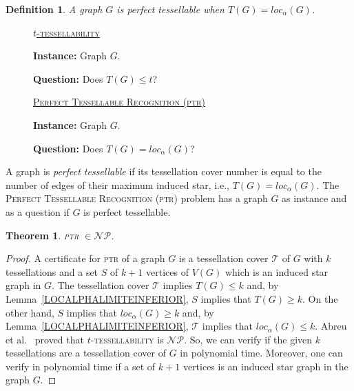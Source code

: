 \documentclass[9pt]{entcs} \usepackage{entcsmacro}
\newtheorem{defi}{Definition}[section]
\newtheorem{teo}{Theorem}[section]
\begin{document}
\begin{defi}
\emph{A graph $G$ is \textit{perfect tessellable} when $T(G) = loc_{\alpha}(G)$.}
\end{defi}

\bigskip

\begin{minipage}[c]{0.5\textwidth}
\begin{center}
		\begin{description}
			\item[] \underline{\textsc{$t$-tessellability}}
			\item[] \textbf{Instance:} Graph $G$.
			\item[] \textbf{Question:} Does $T(G) \leq t$? 
		\end{description}
\end{center}
\end{minipage}		
\hfill
\begin{minipage}[c]{0.5\linewidth}	  
			\begin{center}
		\begin{description}
			\item[] \underline{\textsc{Perfect Tessellable Recognition} (\textsc{ptr})}
			\item[] \textbf{Instance:} Graph $G$.
			\item[] \textbf{Question:} Does $T(G) = loc_\alpha(G)$? 
		\end{description}
			\end{center}
\end{minipage}

\bigskip


A graph is \textit{perfect tessellable} if its tessellation cover number is equal to  the number of edges of their maximum induced star, i.e., $T(G) = loc_\alpha(G)$.
The \textsc{Perfect Tessellable Recognition} (\textsc{ptr}) problem has a graph $G$ as instance and as a question if $G$ is perfect tessellable.


\begin{teo}
\textsc{ptr} $\in \mathcal{NP}$.
\label{teo:ptrnp}
\end{teo}
\begin{proof}
 A certificate for \textsc{ptr} of a graph $G$ is a tessellation cover $\mathcal{T}$ of $G$ with $k$ tessellations and a set $S$ of $k+1$ vertices of $V(G)$ which is an induced star graph in $G$.
  The tessellation cover $\mathcal{T}$ implies $T(G) \leq k$ and, by Lemma~\ref{LOCALPHALIMITEINFERIOR}, $S$ implies that $T(G) \geq k$.
 On the other hand, $S$ implies that $loc_\alpha(G) \geq k$ and, by Lemma~\ref{LOCALPHALIMITEINFERIOR}, $\mathcal{T}$ implies that $loc_\alpha(G) \leq k$.
  Abreu et al.~\cite{ArLatin} proved that \textsc{$t$-tessellability} is $\mathcal{NP}$.
 So, we can verify if the given $k$ tessellations are a tessellation cover of $G$ in polynomial time.
 Moreover, one can verify in polynomial time if a set of $k+1$ vertices is an induced star graph in the graph $G$.
 \end{proof}
\end{document}
